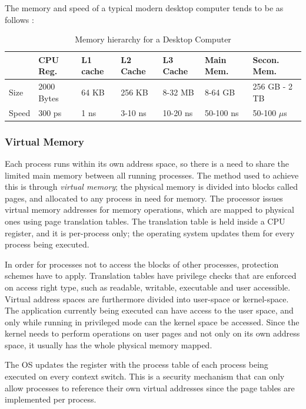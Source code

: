 \documentclass[sigconf]{acmart}
\begin{document}
The memory and speed of a typical modern desktop computer \cite{Hennessy:2017:CAS:3207796} tends to be as follows :

\begin{table}[h]
  \label{tab:freq}
  \begin{tabular}{p{0.66cm}|p{0.75cm}p{0.75cm}p{0.75cm}p{0.75cm}p{1cm}p{1cm}}
     & \textbf{CPU Reg.} & \textbf{L1 cache} & \textbf{L2 Cache} & \textbf{L3 Cache} & \textbf{Main Mem.} & \textbf{Secon. Mem.}\\
     \hline
    Size & 2000 Bytes & 64 KB & 256 KB & 8-32 MB & 8-64 GB & 256 GB - 2 TB\\
    \hline
    Speed & 300 ps & 1 ns & 3-10 ns & 10-20 ns & 50-100 ns & 50-100 $\mu$s\\
\end{tabular}
\caption{Memory hierarchy for a Desktop Computer}
\end{table}

\subsubsection{Virtual Memory}
Each process runs within its own address space, so there is a need to share the limited main memory between all running processes. The method used to achieve this is through {\itshape virtual memory}; the physical memory is divided into blocks called pages, and allocated to any process in need for memory. The processor issues virtual memory addresses for memory operations, which are mapped to physical ones using page translation tables. The translation table is held inside a CPU register, and it is per-process only; the operating system updates them for every process being executed. 

In order for processes not to access the blocks of other processes, protection schemes have to apply. Translation tables have privilege checks that are enforced on access right type, such as readable, writable, executable and user accessible. Virtual address spaces are furthermore divided into user-space or kernel-space. The application currently being executed can have access to the user space, and only while running in privileged mode can the kernel space be accessed. Since the kernel needs to perform operations on user pages and not only on its own address space, it usually has the whole physical memory mapped. 

The OS updates the register with the process table of each process being executed on every context switch. This is a security mechanism that can only allow processes to reference their own virtual addresses since the page tables are implemented per process. 
\end{document}
